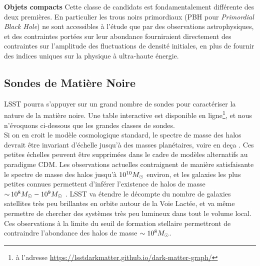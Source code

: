 \documentclass[12pt]{article}
\begin{document}
\noindent \textbf{Objets compacts} Cette classe de candidats est fondamentalement différente des deux premières. En particulier les trous noirs primordiaux (PBH pour {\it Primordial Black Hole}) ne sont accessibles à l'étude que par des observations astrophysiques, et des contraintes portées sur leur abondance fourniraient directement des contraintes sur l'amplitude des fluctuations de densité initiales, en plus de fournir des indices uniques sur la physique à ultra-haute énergie.


\vspace{-1em} \subsection*{Sondes de Matière Noire} \vspace{-0.5em}
LSST pourra s'appuyer sur un grand nombre de sondes pour caractériser la nature de la matière noire. Une table interactive est disponible en ligne\footnote{à l'adresse \href{https://lsstdarkmatter.github.io/dark-matter-graph/}{https://lsstdarkmatter.github.io/dark-matter-graph/}}, et nous n'évoquons ci-dessous que les grandes classes de sondes.\\
Si on en croit le modèle cosmologique standard, le spectre de masse des halos devrait être invariant d'échelle jusqu'à des masses planétaires, voire en deça \citep[par exemple]{Green:2003un,2005Natur.433..389D,1412.5930}. Ces petites échelles peuvent être supprimées dans le cadre de modèles alternatifs au paradigme CDM.
Les observations actuelles contraignent de manière satisfaisante le spectre de masse des halos jusqu'à $10^{10}M_\odot$ environ, et les galaxies les plus petites connues permettent d'inférer l'existence de halos de masse $ {\sim}\, 10^8 M_\odot - 10^9 M_\odot$ \citep{2017MNRAS.467.2019R,behroozi2018,Jethwa:2018,Kim:2017iwr,Nadler:2018,1807.07093}. 
LSST va étendre le décompte du nombre de galaxies satellites très peu brillantes en orbite autour de la Voie Lactée, et va même permettre de chercher des systèmes très peu lumineux dans tout le volume local. Ces observations à la limite du seuil de formation stellaire permettront de contraindre l'abondance des halos de masse $\sim10^8 M_\odot$.
\end{document}
